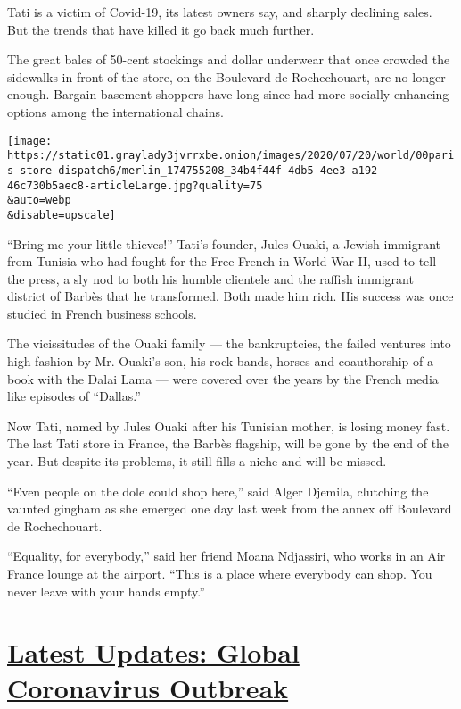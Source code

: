 Tati is a victim of Covid-19, its latest owners say, and sharply
declining sales. But the trends that have killed it go back much
further.

The great bales of 50-cent stockings and dollar underwear that once
crowded the sidewalks in front of the store, on the Boulevard de
Rochechouart, are no longer enough. Bargain-basement shoppers have long
since had more socially enhancing options among the international
chains.

\texttt{[image: https://static01.graylady3jvrrxbe.onion/images/2020/07/20/world/00paris-store-dispatch6/merlin\_174755208\_34b4f44f-4db5-4ee3-a192-46c730b5aec8-articleLarge.jpg?quality=75\\\&auto=webp\\\&disable=upscale]}

``Bring me your little thieves!'' Tati's founder, Jules Ouaki, a Jewish
immigrant from Tunisia who had fought for the Free French in World War
II, used to tell the press, a sly nod to both his humble clientele and
the raffish immigrant district of Barbès that he transformed. Both made
him rich. His success was once studied in French business schools.

The vicissitudes of the Ouaki family --- the bankruptcies, the failed
ventures into high fashion by Mr. Ouaki's son, his rock bands, horses
and coauthorship of a book with the Dalai Lama --- were covered over the
years by the French media like episodes of ``Dallas.''

Now Tati, named by Jules Ouaki after his Tunisian mother, is losing
money fast. The last Tati store in France, the Barbès flagship, will be
gone by the end of the year. But despite its problems, it still fills a
niche and will be missed.

``Even people on the dole could shop here,'' said Alger Djemila,
clutching the vaunted gingham as she emerged one day last week from the
annex off Boulevard de Rochechouart.

``Equality, for everybody,'' said her friend Moana Ndjassiri, who works
in an Air France lounge at the airport. ``This is a place where
everybody can shop. You never leave with your hands empty.''

\hypertarget{latest-updates-global-coronavirus-outbreak}{%
\section{\texorpdfstring{\href{https://www.nytimes3xbfgragh.onion/2020/08/01/world/coronavirus-covid-19.html?action=click\&pgtype=Article\&state=default\&region=MAIN_CONTENT_1\&context=storylines_live_updates}{Latest
Updates: Global Coronavirus
Outbreak}}{Latest Updates: Global Coronavirus Outbreak}}\label{latest-updates-global-coronavirus-outbreak}}

